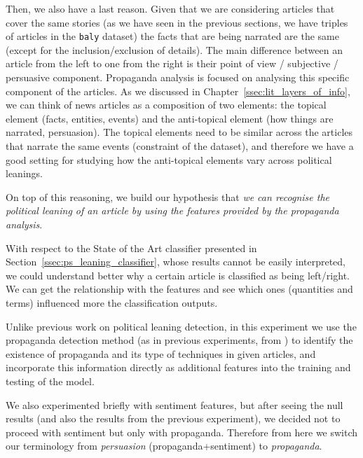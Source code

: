 Then, we also have a last reason. %
Given that we are considering articles that cover the same stories (as we have seen in the previous sections, we have triples of articles in the \texttt{baly} dataset) the facts that are being narrated are the same (except for the inclusion/exclusion of details). The main difference between an article from the left to one from the right is their point of view / subjective / persuasive component. Propaganda analysis is focused on analysing this specific component of the articles.
As we discussed in Chapter~\ref{ssec:lit_layers_of_info}, we can think of news articles as a composition of two elements: the topical element (facts, entities, events) and the anti-topical element (how things are narrated, persuasion).
The topical elements need to be similar across the articles that narrate the same events (constraint of the dataset), and therefore we have a good setting for studying how the anti-topical elements vary across political leanings. 

On top of this reasoning, we build our hypothesis that \emph{we can recognise the political leaning of an article by using the features provided by the propaganda analysis}.

With respect to the State of the Art classifier presented in Section~\ref{ssec:ps_leaning_classifier}, whose results cannot be easily interpreted, we could understand better why a certain article is classified as being left/right. We can get the relationship with the features and see which ones (quantities and terms) influenced more the classification outputs. 



Unlike previous work on political leaning detection, in this experiment we use the propaganda detection method (as in previous experiments, from \citet{da2019fine}) to identify the existence of propaganda and its type of techniques in given articles, and incorporate this information directly as additional features into the training and testing of the model.  

We also experimented briefly with sentiment features, but after seeing the null results (and also the results from the previous experiment), we decided not to proceed with sentiment but only with propaganda.
Therefore from here we switch our terminology from \emph{persuasion} (propaganda+sentiment) to \emph{propaganda}.

